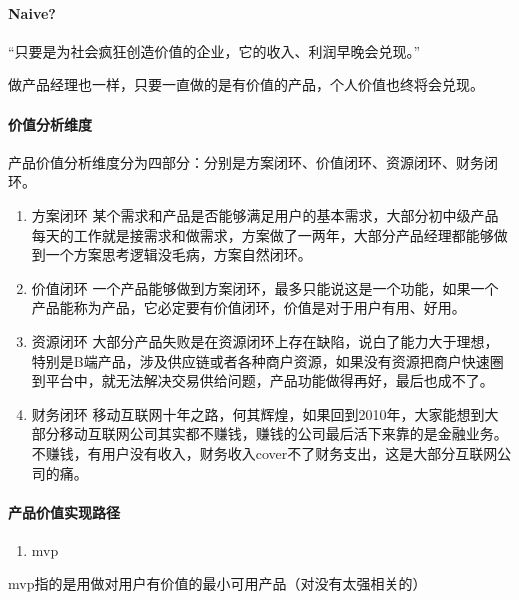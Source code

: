 \documentclass[letterpaper,11pt,english]{sphinxmanual}
\begin{document}
\paragraph{Naive?}
\label{\detokenize{chapter_project/valuable:naive}}
“只要是为社会疯狂创造价值的企业，它的收入、利润早晚会兑现。”

做产品经理也一样，只要一直做的是有价值的产品，个人价值也终将会兑现。


\paragraph{价值分析维度}
\label{\detokenize{chapter_project/valuable:id3}}
产品价值分析维度分为四部分：分别是方案闭环、价值闭环、资源闭环、财务闭环。
\begin{enumerate}
%
\item {} 
方案闭环
某个需求和产品是否能够满足用户的基本需求，大部分初中级产品每天的工作就是接需求和做需求，方案做了一两年，大部分产品经理都能够做到一个方案思考逻辑没毛病，方案自然闭环。

\item {} 
价值闭环
一个产品能够做到方案闭环，最多只能说这是一个功能，如果一个产品能称为产品，它必定要有价值闭环，价值是对于用户有用、好用。

\item {} 
资源闭环
大部分产品失败是在资源闭环上存在缺陷，说白了能力大于理想，特别是B端产品，涉及供应链或者各种商户资源，如果没有资源把商户快速圈到平台中，就无法解决交易供给问题，产品功能做得再好，最后也成不了。

\item {} 
财务闭环
移动互联网十年之路，何其辉煌，如果回到2010年，大家能想到大部分移动互联网公司其实都不赚钱，赚钱的公司最后活下来靠的是金融业务。不赚钱，有用户没有收入，财务收入cover不了财务支出，这是大部分互联网公司的痛。

\end{enumerate}


\paragraph{产品价值实现路径}
\label{\detokenize{chapter_project/valuable:id4}}\begin{enumerate}
%
\item {} 
mvp

\end{enumerate}

mvp指的是用做对用户有价值的最小可用产品（对没有太强相关的）
\end{document}
